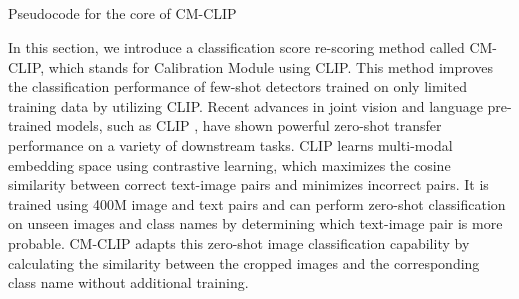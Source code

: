 \documentclass{article}
\begin{document}
\begin{algorithm}[!b]
        \\
        \\
        \PyCode{}\\

        \\
        
        
    \Indm
    
\caption{Pseudocode for the core of CM-CLIP}
\label{algo:your-algo}
\end{algorithm}

In this section, we introduce a classification score re-scoring method called CM-CLIP, which stands for Calibration Module using CLIP. 
This method improves the classification performance of few-shot detectors trained on only limited training data by utilizing CLIP.
Recent advances in joint vision and language pre-trained models, such as CLIP \cite{clip}, have shown powerful zero-shot transfer performance on a variety of downstream tasks.
CLIP learns multi-modal embedding space using contrastive learning, which maximizes the cosine similarity between correct text-image pairs and minimizes incorrect pairs. It is trained using 400M  image and text pairs and can perform zero-shot classification on unseen images and class names by determining which text-image pair is more probable. 
CM-CLIP adapts this zero-shot image classification capability by calculating the similarity between the cropped images and the corresponding class name without additional training.
\end{document}
